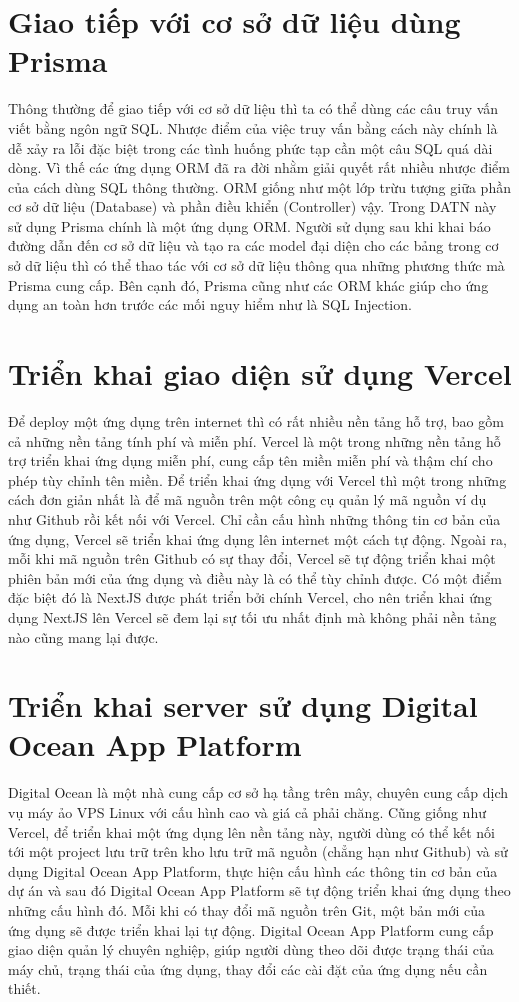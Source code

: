 \documentclass[../DoAn.tex]{subfiles}
\begin{document}
\section{Giao tiếp với cơ sở dữ liệu dùng Prisma\cite{Prisma}}
Thông thường để giao tiếp với cơ sở dữ liệu thì ta có thể dùng các câu truy vấn viết bằng ngôn ngữ SQL. Nhược điểm của việc truy vấn bằng cách này chính là dễ xảy ra lỗi đặc biệt trong các tình huống phức tạp cần một câu SQL quá dài dòng. Vì thế các ứng dụng ORM đã ra đời nhằm giải quyết rất nhiều nhược điểm của cách dùng SQL thông thường. ORM giống như một lớp trừu tượng giữa phần cơ sở dữ liệu (Database) và phần điều khiển (Controller) vậy. Trong DATN này sử dụng Prisma chính là một ứng dụng ORM. Người sử dụng sau khi khai báo đường dẫn đến cơ sở dữ liệu và tạo ra các model đại diện cho các bảng trong cơ sở dữ liệu thì có thể thao tác với cơ sở dữ liệu thông qua những phương thức mà Prisma cung cấp. Bên cạnh đó, Prisma cũng như các ORM khác giúp cho ứng dụng an toàn hơn trước các mối nguy hiểm như là SQL Injection.

\section{Triển khai giao diện sử dụng Vercel\cite{Vercel}}
Để deploy một ứng dụng trên internet thì có rất nhiều nền tảng hỗ trợ, bao gồm cả những nền tảng tính phí và miễn phí. Vercel là một trong những nền tảng hỗ trợ triển khai ứng dụng miễn phí, cung cấp tên miền miễn phí và thậm chí cho phép tùy chỉnh tên miền. Để triển khai ứng dụng với Vercel thì một trong những cách đơn giản nhất là để mã nguồn trên một công cụ quản lý mã nguồn ví dụ như Github rồi kết nối với Vercel. Chỉ cần cấu hình những thông tin cơ bản của ứng dụng, Vercel sẽ triển khai ứng dụng lên internet một cách tự động. Ngoài ra, mỗi khi mã nguồn trên Github có sự thay đổi, Vercel sẽ tự động triển khai một phiên bản mới của ứng dụng và điều này là có thể tùy chỉnh được. Có một điểm đặc biệt đó là NextJS được phát triển bởi chính Vercel, cho nên triển khai ứng dụng NextJS lên Vercel sẽ đem lại sự tối ưu nhất định mà không phải nền tảng nào cũng mang lại được.

\section{Triển khai server sử dụng Digital Ocean App Platform\cite{DigitalOcean}}
Digital Ocean là một nhà cung cấp cơ sở hạ tầng trên mây, chuyên cung cấp dịch vụ máy ảo VPS Linux với cấu hình cao và giá cả phải chăng. Cũng giống như Vercel, để triển khai một ứng dụng lên nền tảng này, người dùng có thể kết nối tới một project lưu trữ trên kho lưu trữ mã nguồn (chẳng hạn như Github) và sử dụng Digital Ocean App Platform, thực hiện cấu hình các thông tin cơ bản của dự án và sau đó Digital Ocean App Platform sẽ tự động triển khai ứng dụng theo những cấu hình đó. Mỗi khi có thay đổi mã nguồn trên Git, một bản mới của ứng dụng sẽ được triển khai lại tự động. Digital Ocean App Platform cung cấp giao diện quản lý chuyên nghiệp, giúp người dùng theo dõi được trạng thái của máy chủ, trạng thái của ứng dụng, thay đổi các cài đặt của ứng dụng nếu cần thiết.
\end{document}
